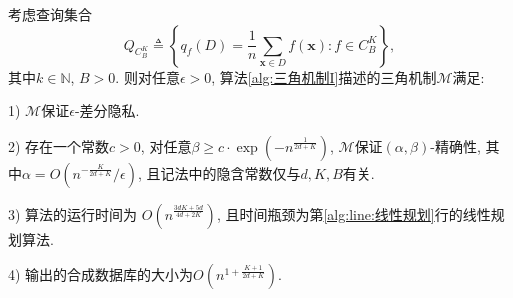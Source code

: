 \begin{thm}\label{thm:epsilon_差分隐私机制}
  考虑查询集合
  \[
    Q_{C_B^K} \triangleq \left\{q_f(D) = \frac{1}{n} \sum_{\mathbf{x} \in D} f(\mathbf{x})\colon f \in C_B^K \right\},
  \]
  其中$k\in\mathbb N$, $B > 0$. 则对任意$\epsilon > 0$, 算法\ref{alg:三角机制I}描述的三角机制$\mathcal{M}$满足:
  
  1) $\mathcal{M}$保证$\epsilon$-差分隐私.
  
  2) 存在一个常数$c > 0$, 对任意$\beta\ge c\cdot \exp\left(-n^{\frac{1}{2d+K}}\right)$, $\mathcal{M}$保证$(\alpha, \beta)$-精确性, 其中$\alpha=O \left(n^{-\frac{K}{2d+K}}/\epsilon\right)$, 且记法中的隐含常数仅与$d, K, B$有关.
  
  3) 算法的运行时间为 $O\left(n^{\frac{3dK+5d}{4d+2K}}\right)$, 且时间瓶颈为第\ref{alg:line:线性规划}行的线性规划算法.
  
  4) 输出的合成数据库的大小为$O\left(n^{1+\frac{K+1}{2d+K}}\right)$.
\end{thm}
